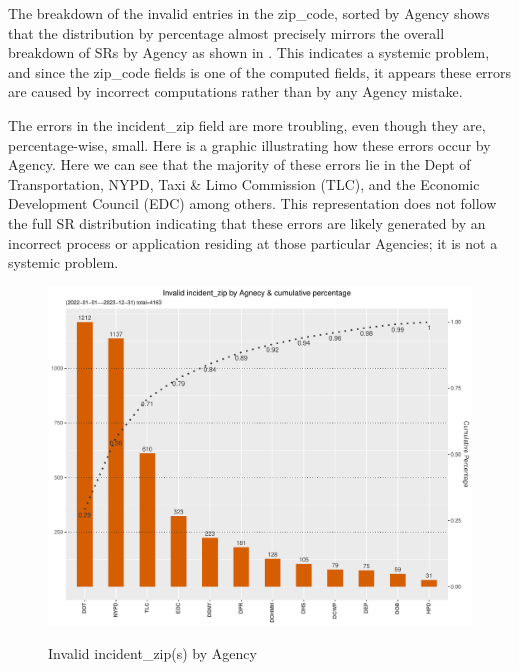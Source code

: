 \documentclass[12pt, titlepage]{article}
\begin{document}
	The breakdown of the invalid entries in the zip\_code, sorted by Agency shows that the distribution by percentage
	almost precisely mirrors the overall breakdown of SRs by Agency as shown in . This indicates a systemic problem, and since the
	zip\_code fields is one of the computed fields, it appears these errors are caused by incorrect computations rather
	than by any Agency mistake.
	
	The  errors in the incident\_zip field are more troubling, even though they are, percentage-wise, small. Here is a graphic 
	illustrating how these errors occur by Agency. Here we can see that the majority of these errors lie in the Dept of Transportation,
	NYPD, Taxi \& Limo Commission (TLC), and the Economic Development Council (EDC) among others. This representation
	does not follow the full SR distribution indicating that these errors are likely generated by an incorrect
	process or application residing at those particular Agencies; it is not a systemic problem.

	\begin{figure}[tbp]
		\centering
		\caption{Invalid incident\_zip(s) by Agency}
		\includegraphics[width=\textwidth]{invalid_incident_zip.pdf} 
		\label{fig:invalid_incident_zip}
	\end{figure}
	
\end{document}
